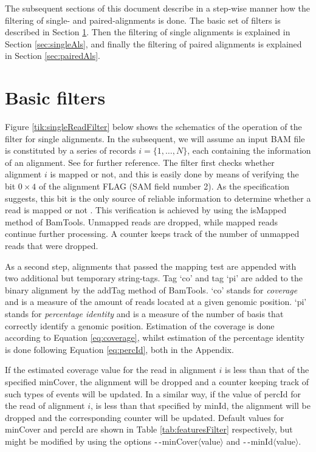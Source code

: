 \documentclass[11pt]{article}
\newcommand{\printOption}[1]{$\textrm{-\,-}${\fontfamily{phv}\selectfont#1}$\langle${\fontfamily{phv}\selectfont value}$\rangle$}
\newcommand{\option}[1]{{\fontfamily{phv}\selectfont#1}}
\newcommand{\bamApi}[1]{#1}
\begin{document}
{The subsequent sections of this document describe in a step-wise manner how the filtering of single- and 
paired-alignments is done. The basic set of filters is described in Section \ref{sec:basicFilters}. 
Then the filtering of single alignments is explained in Section \ref{sec:singleAls}, and finally the filtering 
of paired alignments is explained in Section \ref{sec:pairedAls}.


\section{Basic filters} \label{sec:basicFilters}
Figure \ref{tik:singleReadFilter} below shows the schematics of the operation of the filter for single 
alignments. In the subsequent, we will assume an input BAM file is constituted by a series of records 
$i=\{1,\dots,N\}$, each containing the information of an alignment. See \citep{heng09:SAM} for further 
reference. The filter first checks whether 
alignment $i$ is mapped or not, and this is easily done by means of verifying the bit $0\times4$ of the 
alignment FLAG (SAM field number 2). As the specification suggests, this bit is the only source 
of reliable information to determine whether a read is mapped or not \citet{heng09:SAM}. This verification 
is achieved by using the \bamApi{isMapped} method of BamTools. Unmapped reads are dropped, while mapped 
reads continue further processing. A counter keeps track of the number of unmapped reads that were dropped. 

As a second step, alignments that passed the mapping test are appended with two additional but temporary 
string-tags. Tag `co' and tag `pi' are added to the binary alignment by the \bamApi{addTag} method of BamTools. 
`co' stands for \emph{coverage} and is a measure of the amount of reads located at a given genomic position. 
`pi' stands for \emph{percentage identity} and is a measure of the number of basis that correctly identify 
a genomic position. Estimation of the coverage is done according to Equation \ref{eq:coverage}, whilst 
estimation of the percentage identity is done following Equation \ref{eq:percId}, both in the Appendix. 

If the estimated coverage value for the read in alignment $i$ is less than that of the specified 
\option{minCover}, the alignment will be dropped and a counter keeping track of such types of events will 
be updated. In a similar way, if the value of \option{percId} for the read of alignment $i$, is less than that 
specified by \option{minId}, the alignment will be dropped and the corresponding counter will be updated. 
Default values for \option{minCover} and \option{percId} are shown in Table \ref{tab:featuresFilter} 
respectively, but might be modified by using the options \printOption{minCover} and \printOption{minId}.


}
\end{document}
